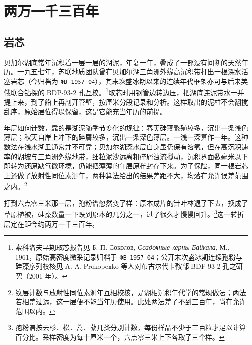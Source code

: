 \chapter{两万一千三百年}


\section{岩芯}

贝加尔湖底常年沉积着一层一层的湖泥，年复一年，叠成了一部没有间断的天然年历。一九五七年，苏联地质团队曾在贝加尔湖三角洲外缘高沉积带打出一根深水活塞岩芯（今归档为 \texttt{ФВ-1957-04}），其末次盛冰期以来的连续年代框架亦可与后来美俄联合钻探的 BDP-93-2 孔互校。\footnote{索科洛夫早期取芯报告见 Б. П. Соколов, \textit{Осадочные керны Байкала}, М., 1961，原始高密度微采记录归档于 \texttt{ФВ-1957-04}；公开末次盛冰期连续孢粉与硅藻序列校核见 A. A. Prokopenko 等人对布古尔代卡鞍部 BDP-93-2 孔之研究（2001 年）。}取芯时用钢管边转边压，把湖底连泥带水一并提上来，到了船上再剖开管壁，按厘米分段记录和分析。这样取出的泥柱不会翻搅乱序，原始层位得以保留，这是它能充当年历的前提。

年层如何计数，靠的是湖泥随季节变化的规律：春天硅藻繁殖较多，沉出一条浅色薄层；秋天自岸上冲下的碎屑较多，沉出一条深色薄层。一浅一深算作一年。这种数法在浅水湖里通常并不可靠；贝加尔湖深水层自身虽仍保有溶氧，但在高沉积速率的湖坡与三角洲外缘地带，细粒泥沙远离粗碎屑浊流搅动，沉积界面数毫米以下即转为还原缺氧微环境，仍能把薄薄的年层原样封存下来。为了保险，同一根岩芯上还做了放射性同位素测年，两种算法给出的结果差距不大，均落在允许误差范围之内。\footnote{纹层计数与放射性同位素测年互相校核，是湖相沉积年代学的常规做法；两法若相差过远，这一层便不能当年历使用。此处两法差了不到三百年，尚在允许范围以内。}

打到六点零三米那一层，孢粉谱忽然变了样：原本成片的针叶林退了下去，换成了草原植被，硅藻数量一下跌到原本的几分之一，过了很久才慢慢回升。\footnote{孢粉谱按云杉、松、蒿、藜几类分别计数，每份样品不少于三百粒才足以计算百分比。采样密度为每十厘米一个，六点零三米上下各取了三个样。}这一转折层定在距今约两万一千三百年。

